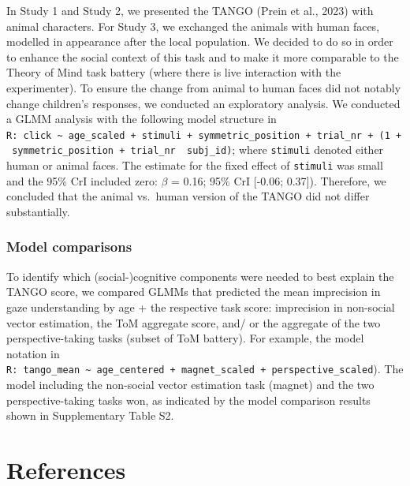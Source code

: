 \documentclass[
  man,mask,floatsintext]{apa7}
\begin{document}
In Study 1 and Study 2, we presented the TANGO (Prein et al., 2023) with animal characters. For Study 3, we exchanged the animals with human faces, modelled in appearance after the local population. We decided to do so in order to enhance the social context of this task and to make it more comparable to the Theory of Mind task battery (where there is live interaction with the experimenter). To ensure the change from animal to human faces did not notably change children's responses, we conducted an exploratory analysis. We conducted a GLMM analysis with the following model structure in \texttt{R:\ click\ \textasciitilde{}\ age\_scaled\ +\ stimuli\ +\ symmetric\_position\ +\ trial\_nr\ +\ (1\ +\ symmetric\_position\ +\ trial\_nr\ \textbar{}\ subj\_id)}; where \texttt{stimuli} denoted either human or animal faces. The estimate for the fixed effect of \texttt{stimuli} was small and the 95\% CrI included zero: \(\beta\) = 0.16; 95\% CrI {[}-0.06; 0.37{]}). Therefore, we concluded that the animal vs.~human version of the TANGO did not differ substantially.

\hypertarget{model-comparisons}{%
\subsubsection{Model comparisons}\label{model-comparisons}}

To identify which (social-)cognitive components were needed to best explain the TANGO score, we compared GLMMs that predicted the mean imprecision in gaze understanding by age + the respective task score: imprecision in non-social vector estimation, the ToM aggregate score, and/ or the aggregate of the two perspective-taking tasks (subset of ToM battery). For example, the model notation in \texttt{R:\ tango\_mean\ \textasciitilde{}\ age\_centered\ +\ magnet\_scaled\ +\ perspective\_scaled}). The model including the non-social vector estimation task (magnet) and the two perspective-taking tasks won, as indicated by the model comparison results shown in Supplementary Table S2.

\newpage

\hypertarget{references}{%
\section{References}\label{references}}

\begingroup
\setlength{\parindent}{-0.5in}
\setlength{\leftskip}{0.5in}
\end{document}
